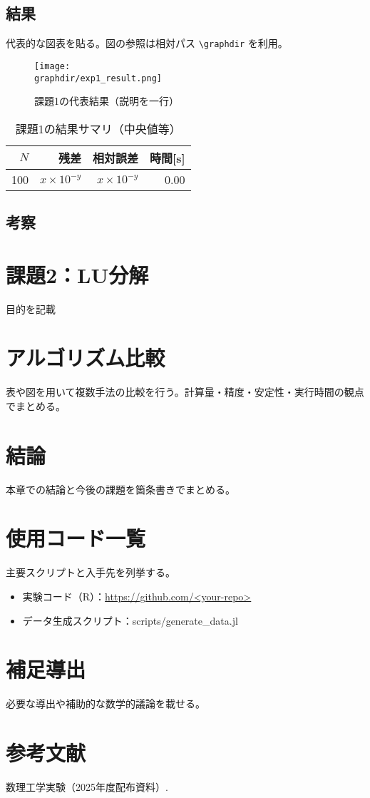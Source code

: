 \documentclass[a4paper,11pt]{ltjsarticle}
\newcommand{\graphdir}{graphs}
\begin{document}
\subsection{結果}
代表的な図表を貼る。図の参照は相対パス \verb|\graphdir| を利用。
\begin{figure}[H]
  \centering
  \texttt{[image: \\graphdir/exp1\_result.png]}
  \caption{課題1の代表結果（説明を一行）}
  \label{fig:exp1_result}
\end{figure}

\begin{table}[H]
\centering
\caption{課題1の結果サマリ（中央値等）}
\begin{tabular}{r|r r r}
\toprule
$N$ & 残差 & 相対誤差 & 時間[s] \\
\midrule
100 & $x\times10^{-y}$ & $x\times10^{-y}$ & 0.00 \\
\bottomrule
\end{tabular}
\end{table}

\subsection{考察}

\section{課題2：LU分解}{目的を記載}

\section{アルゴリズム比較}
表や図を用いて複数手法の比較を行う。計算量・精度・安定性・実行時間の観点でまとめる。

\section{結論}
本章での結論と今後の課題を箇条書きでまとめる。

\appendix
\section{使用コード一覧}
主要スクリプトと入手先を列挙する。
\begin{itemize}
  \item 実験コード（R）：\url{https://github.com/<your-repo>}
  \item データ生成スクリプト：scripts/generate_data.jl
\end{itemize}

\section{補足導出}
必要な導出や補助的な数学的議論を載せる。

\section*{参考文献}
\begin{thebibliography}{9}
 数理工学実験（2025年度配布資料）.
\end{thebibliography}
\end{document}
